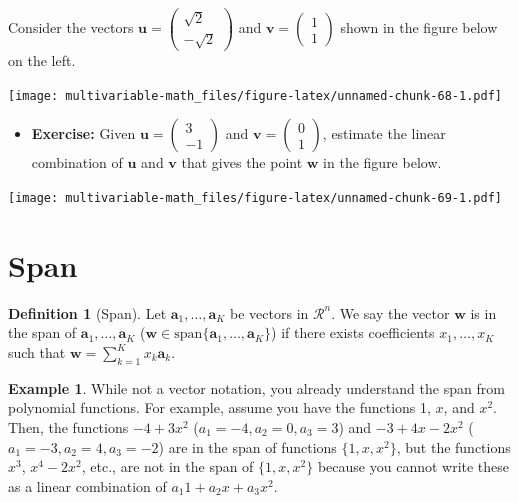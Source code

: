 \documentclass[
]{book}
\providecommand{\tightlist}{%
  \setlength{\itemsep}{0pt}\setlength{\parskip}{0pt}}
\theoremstyle{definition}
\newtheorem{definition}{Definition}[chapter]
\theoremstyle{definition}
\newtheorem{example}{Example}[chapter]
\theoremstyle{definition}
\theoremstyle{definition}
\theoremstyle{remark}
\begin{document}
Consider the vectors \(\mathbf{u} = \begin{pmatrix} \sqrt{2} \\ - \sqrt{2} \end{pmatrix}\) and \(\mathbf{v} = \begin{pmatrix} 1 \\ 1 \end{pmatrix}\) shown in the figure below on the left.

\texttt{[image: multivariable-math\_files/figure-latex/unnamed-chunk-68-1.pdf]}

\begin{itemize}
\tightlist
\item
  \textbf{Exercise:} Given \(\mathbf{u} = \begin{pmatrix} 3 \\ -1 \end{pmatrix}\) and \(\mathbf{v} = \begin{pmatrix} 0 \\ 1 \end{pmatrix}\), estimate the linear combination of \(\mathbf{u}\) and \(\mathbf{v}\) that gives the point \(\mathbf{w}\) in the figure below.
\end{itemize}

\texttt{[image: multivariable-math\_files/figure-latex/unnamed-chunk-69-1.pdf]}

\hypertarget{span}{%
\section{Span}\label{span}}

\begin{definition}[Span]
\protect\hypertarget{def:span}{}\label{def:span}Let \(\mathbf{a}_1, \ldots, \mathbf{a}_K\) be vectors in \(\mathcal{R}^n\). We say the vector \(\mathbf{w}\) is in the span of \(\mathbf{a}_1, \ldots, \mathbf{a}_K\) (\(\mathbf{w} \in \mbox{span}\{ \mathbf{a}_1, \ldots, \mathbf{a}_K \}\)) if there exists coefficients \(x_1, \ldots, x_K\) such that \(\mathbf{w} = \sum_{k=1}^K x_k \mathbf{a}_k\).
\end{definition}

\begin{example}
While not a vector notation, you already understand the span from polynomial functions. For example, assume you have the functions 1, \(x\), and \(x^2\). Then, the functions \(-4 + 3x^2\) (\(a_1 = -4, a_2 = 0, a_3 = 3\)) and \(-3 + 4x - 2x^2\) (\(a_1 = -3, a_2 = 4, a_3 = -2\)) are in the span of functions \(\{1, x, x^2\}\), but the functions \(x^3\), \(x^4 - 2x^2\), etc., are not in the span of \(\{1, x, x^2\}\) because you cannot write these as a linear combination of \(a_1 1 + a_2 x + a_3 x^2\).
\end{example}
\end{document}
